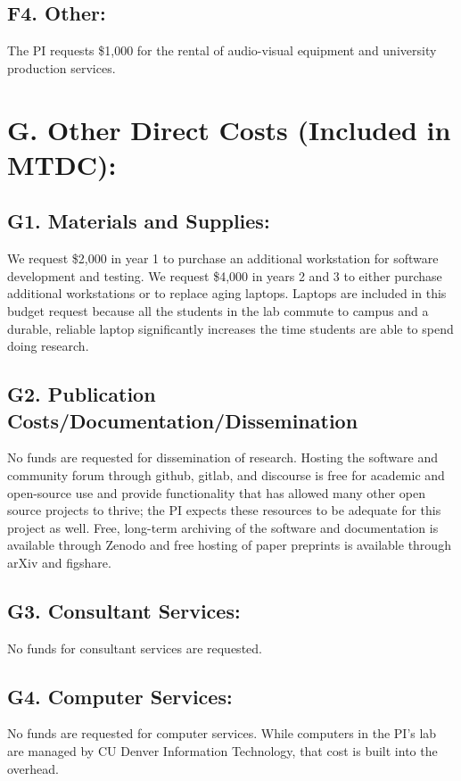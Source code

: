 \documentclass[11pt,oneside]{memoir}
\begin{document}
\subsection*{F4. Other:}  The PI requests \$1,000 for the rental of audio-visual equipment and university production services.

\section*{G. Other Direct Costs (Included in MTDC):}
\subsection*{G1. Materials and Supplies:}
We request \$2,000 in year 1 to purchase an additional workstation for software development and testing. We request \$4,000 in years 2 and 3 to either purchase additional workstations or to replace aging laptops.  Laptops are included in this budget request because all the students in the lab commute to campus and a durable, reliable laptop significantly increases the time students are able to spend doing research.

\subsection*{G2. Publication Costs/Documentation/Dissemination}
No funds are requested for dissemination of research.  Hosting the software and community forum through github, gitlab, and discourse is free for academic and open-source use and provide functionality that has allowed many other open source projects to thrive; the PI expects these resources to be adequate for this project as well.  Free, long-term archiving of the software and documentation is available through Zenodo and free hosting of paper preprints is available through arXiv and figshare.  %

\subsection*{G3. Consultant Services:}
No funds for consultant services are requested.

\subsection*{G4. Computer Services:}
No funds are requested for computer services.  While computers in the PI's lab are managed by CU Denver Information Technology, that cost is built into the overhead.
\end{document}
